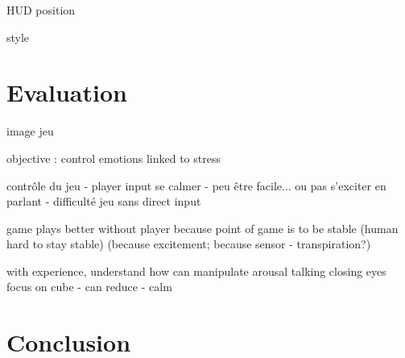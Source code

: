 \documentclass[12pt,a4paper]{article}
\begin{document}
HUD position

style


\section{Evaluation}

image jeu 

objective : control emotions linked to stress

contrôle du jeu - player input
se calmer - peu être facile... ou pas
s'exciter en parlant
- difficulté jeu sans direct input

game plays better without player
because point of game is to be stable
(human hard to stay stable)
(because excitement; because sensor - transpiration?)

with experience, understand how can manipulate arousal
talking
closing eyes
focus on cube - can reduce - calm

\section{Conclusion}
\end{document}
